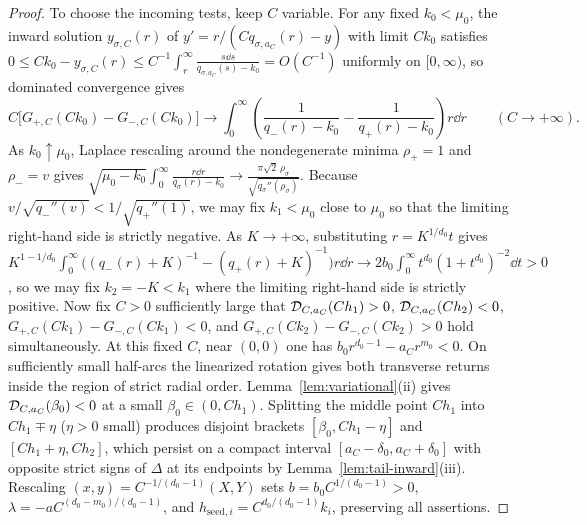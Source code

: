 \begin{proof}
To choose the incoming tests, keep $C$ variable. For any fixed $k_0<\mu_0$, the inward solution
$y_{\sigma,C}(r)$ of $y'=r/(Cq_{\sigma,a_C}(r)-y)$ with limit $Ck_0$ satisfies $0\le
Ck_0-y_{\sigma,C}(r)\le C^{-1}\int_r^\infty \frac{s\dd s}{q_{\sigma,a_C}(s)-k_0}=O(C^{-1})$ uniformly
on $[0,\infty)$, so dominated convergence gives
\[
  C\bigl[G_{+,C}(Ck_0) - G_{-,C}(Ck_0)\bigr] \longrightarrow \int_0^\infty \left(\frac{1}{q_-(r)-k_0}
  - \frac{1}{q_+(r)-k_0}\right)r\dd r \qquad (C\to+\infty).
\]
As $k_0\uparrow\mu_0$, Laplace rescaling around the nondegenerate minima $\rho_+=1$ and $\rho_-=v$
gives $\sqrt{\mu_0-k_0}\int_0^\infty \frac{r\dd r}{q_\sigma(r)-k_0}\to
\frac{\pi\sqrt{2}\,\rho_\sigma}{\sqrt{q_\sigma''(\rho_\sigma)}}$. Because
$v/\sqrt{q_-''(v)}<1/\sqrt{q_+''(1)}$, we may fix $k_1<\mu_0$ close to $\mu_0$ so that the limiting
right-hand side is strictly negative. As $K\to+\infty$, substituting $r=K^{1/d_0}t$ gives
$K^{1-1/d_0}\int_0^\infty\bigl((q_-(r)+K)^{-1}-(q_+(r)+K)^{-1}\bigr)r\dd r\to 2b_0\int_0^\infty
t^{d_0}(1+t^{d_0})^{-2}\dd t>0$, so we may fix $k_2=-K<k_1$ where the limiting right-hand side is
strictly positive. Now fix $C>0$ sufficiently large that $\mathcal{D}_{C,a_C}(Ch_1)>0$,
$\mathcal{D}_{C,a_C}(Ch_2)<0$, $G_{+,C}(Ck_1)-G_{-,C}(Ck_1)<0$, and $G_{+,C}(Ck_2)-G_{-,C}(Ck_2)>0$ hold
simultaneously. At this fixed $C$, near $(0,0)$ one has $b_0 r^{d_0-1}-a_C r^{m_0}<0$.
On sufficiently small half-arcs the linearized rotation gives both
transverse returns inside the region of strict radial order.
Lemma~\ref{lem:variational}(ii) gives $\mathcal{D}_{C,a_C}(\beta_0)<0$ at a small $\beta_0\in(0,Ch_1)$.
Splitting the middle point $Ch_1$ into $Ch_1\mp\eta$ ($\eta>0$ small) produces disjoint brackets
$[\beta_0,Ch_1-\eta]$ and $[Ch_1+\eta,Ch_2]$, which persist on a compact interval
$[a_C-\delta_0,a_C+\delta_0]$ with opposite strict signs of $\Delta$ at its endpoints by
Lemma~\ref{lem:tail-inward}(iii). Rescaling $(x,y)=C^{-1/(d_0-1)}(X,Y)$ sets $b=b_0 C^{1/(d_0-1)}>0$,
$\lambda=-a C^{(d_0-m_0)/(d_0-1)}$, and $h_{\mathrm{seed},i}=C^{d_0/(d_0-1)}k_i$, preserving all
assertions.


\end{proof}
